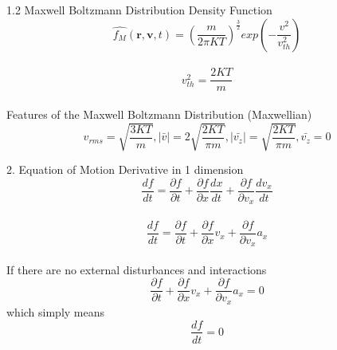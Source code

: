 \documentclass{beamer}
\begin{document}
	\begin{frame}[t]{1.2 Maxwell Boltzmann Distribution} \vspace{10pt}
		Density Function
		\begin{equation}
			\label{eqn:maxwellian}
			\widehat{f_{M}}(\textbf{r}, \textbf{v}, t) = \left(\frac{m}{2\pi KT}\right)^{\frac{3}{2}} exp \left(-\frac{v^{2}}{v_{th}^{2}}\right)
		\end{equation}\\
	$$v_{th}^{2} = \frac{2 K T}{m}$$\\
	\vspace{30pt}
	Features of the Maxwell Boltzmann Distribution (Maxwellian)
	$$ v_{rms} = \sqrt{\frac{3 K T}{m}} \mathrm{,} |\bar{v}| = 2\sqrt{\frac{2 K T}{\pi m}} \mathrm{,} |\bar{v_{z}}| = \sqrt{\frac{2 K T}{\pi m}} \mathrm{,} \bar{v_{z}} = 0 $$
		
		
	\end{frame}

	\begin{frame}[t]{2. Equation of Motion}
		Derivative in 1 dimension
		$$ \frac{df}{dt} = \frac{\partial f}{\partial t} + \frac{\partial f}{\partial x} \frac{d x}{d t} + \frac{\partial f}{\partial v_{x}} \frac{d v_{x}}{d t}$$\\
		
		$$ \frac{df}{dt} = \frac{\partial f}{\partial t} + \frac{\partial f}{\partial x} v_{x} + \frac{\partial f}{\partial v_{x}} a_{x} $$\\
		
		\vspace{20pt}
		If there are no external disturbances and interactions
		$$ \frac{\partial f}{\partial t} + \frac{\partial f}{\partial x} v_{x} + \frac{\partial f}{\partial v_{x}} a_{x} = 0$$
		which simply means
		\begin{equation}
			\label{eqn:eom}
			\frac{df}{dt} = 0
		\end{equation} 
	\end{frame}
\end{document}
